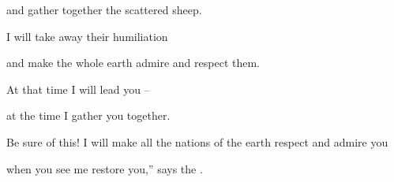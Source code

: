 {\par }{\Q and gather together
the scattered
sheep.
\par }{\Q I will take away their humiliation
\par }{\Q and make
the whole
earth
admire
and respect them.
\par }{\Q {}At that time
I will lead
you –
\par }{\Q at the time I gather you together.
\par }{\Q Be sure of this! I will make all the nations of the earth respect and admire you
\par }{\PP when you see me restore you,” says the
{}.
\par }